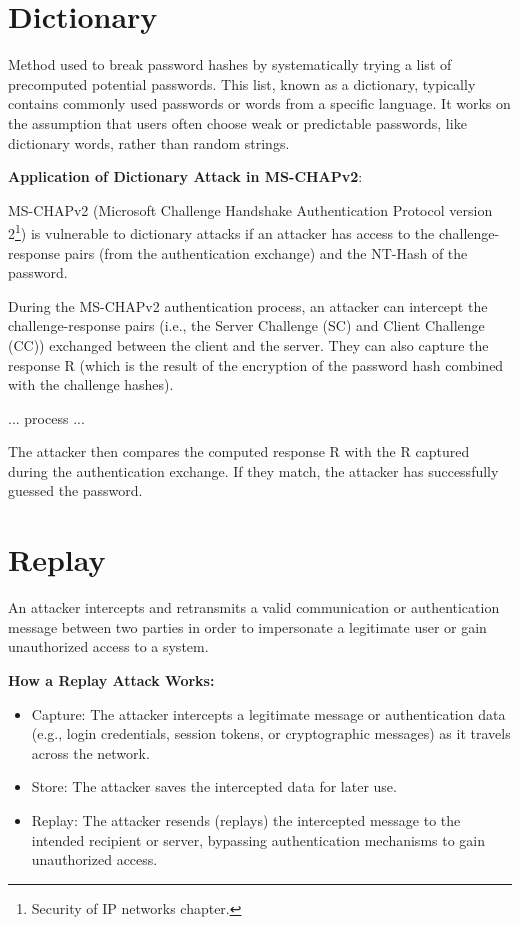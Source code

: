 \centering
\section{Dictionary}
\raggedright
Method used to break password hashes by systematically trying a list of precomputed potential passwords. This list, known as a dictionary, typically contains commonly used passwords or words from a specific language. It works on the assumption that users often choose weak or predictable passwords, like dictionary words, rather than random strings.

\hfill

\textbf{Application of Dictionary Attack in MS-CHAPv2}:

MS-CHAPv2 (Microsoft Challenge Handshake Authentication Protocol version 2\footnote{Security of IP networks chapter.}) is vulnerable to dictionary attacks if an attacker has access to the challenge-response pairs (from the authentication exchange) and the NT-Hash of the password.

During the MS-CHAPv2 authentication process, an attacker can intercept the challenge-response pairs (i.e., the Server Challenge (SC) and Client Challenge (CC)) exchanged between the client and the server. They can also capture the response R (which is the result of the encryption of the password hash combined with the challenge hashes).

... process ... 

The attacker then compares the computed response R with the R captured during the authentication exchange. If they match, the attacker has successfully guessed the password.

\centering
\section{Replay}
\raggedright
An attacker intercepts and retransmits a valid communication or authentication message between two parties in order to impersonate a legitimate user or gain unauthorized access to a system.

\textbf{How a Replay Attack Works:}
\begin{itemize}
    \item Capture: The attacker intercepts a legitimate message or authentication data (e.g., login credentials, session tokens, or cryptographic messages) as it travels across the network.
    \item Store: The attacker saves the intercepted data for later use.
    \item Replay: The attacker resends (replays) the intercepted message to the intended recipient or server, bypassing authentication mechanisms to gain unauthorized access.
\end{itemize}

